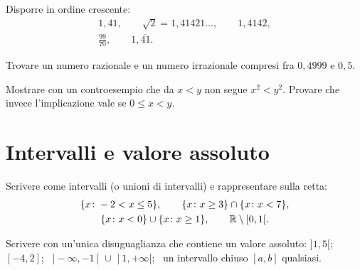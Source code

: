 \begin{esercizio}[\liv{1}]
Disporre in ordine crescente:
\begin{gather*}
1{,}41,\qquad \sqrt2=1{,}41421\ldots,\qquad 1{,}4142,\\
\tfrac{99}{70},\qquad 1{,}\overline{41}.
\end{gather*}
\end{esercizio}

\begin{esercizio}[\liv{2}]
Trovare un numero razionale e un numero irrazionale compresi fra $0{,}4999$ e $0{,}5$.
\end{esercizio}

\begin{esercizio}[\liv{2}]
Mostrare con un controesempio che da $x<y$ non segue $x^2<y^2$. Provare che invece l'implicazione vale se $0\le x<y$.
\end{esercizio}

\section{Intervalli e valore assoluto}

\begin{esercizio}[\liv{1}]
Scrivere come intervalli (o unioni di intervalli) e rappresentare sulla retta:
\begin{gather*}
\{x\colon -2<x\le5\},\qquad \{x\colon x\ge3\}\cap\{x\colon x<7\},\\
\{x\colon x<0\}\cup\{x\colon x\ge1\},\qquad \mathbb R\setminus[0,1[.
\end{gather*}
\end{esercizio}
\risp{$]-2,5]$; \ $[3,7[$; \ $]-\infty,0[\,\cup\,[1,+\infty[$; \ $]-\infty,0[\,\cup\,[1,+\infty[$ (il terzo e il quarto coincidono).}

\begin{esercizio}[\liv{1}]
Scrivere con un'unica disuguaglianza che contiene un valore assoluto: $]1,5[$; \ $[-4,2]$; \ $]-\infty,-1[\,\cup\,]1,+\infty[$; \ un intervallo chiuso $[a,b]$ qualsiasi.
\end{esercizio}

